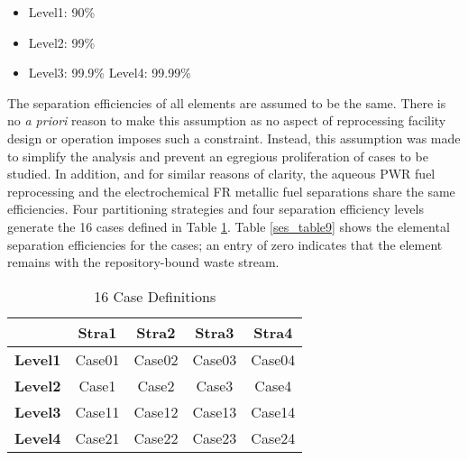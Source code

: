 \begin{itemize}
    \item Level1: 90\%
    \item Level2: 99\% 
    \item Level3: 99.9\%
    \itme Level4: 99.99\%
\end{itemize}

The separation efficiencies of all elements are assumed to be the same.
There is no \emph{a priori} reason to make this assumption as no aspect of
reprocessing facility design or operation imposes such a constraint. 
Instead, this assumption was made to simplify the analysis and prevent
an egregious proliferation of cases to be studied.  In addition, and for
similar reasons of clarity, the aqueous PWR fuel reprocessing and the
electrochemical FR metallic fuel separations share the same
efficiencies. Four partitioning strategies and four separation
efficiency levels generate the 16 cases defined in Table \ref{ses_table8}.  
Table \ref{ses_table9} shows the elemental separation efficiencies for the cases; an entry of
zero indicates that the element remains with the repository-bound waste
stream.

\begin{table}[htbp]
\begin{center}
\caption{16 Case Definitions}
\label{ses_table8}
\begin{tabular}{|l|c|c|c|c|}
\hline
                & \textbf{Stra1} & \textbf{Stra2} & \textbf{Stra3} & \textbf{Stra4} \\
\hline
\textbf{Level1} & Case01         & Case02         & Case03         & Case04 \\
\textbf{Level2} & Case1          & Case2          & Case3          & Case4 \\
\textbf{Level3} & Case11         & Case12         & Case13         & Case14 \\
\textbf{Level4} & Case21         & Case22         & Case23         & Case24 \\
\hline
\end{tabular}
\end{center}
\end{table}

